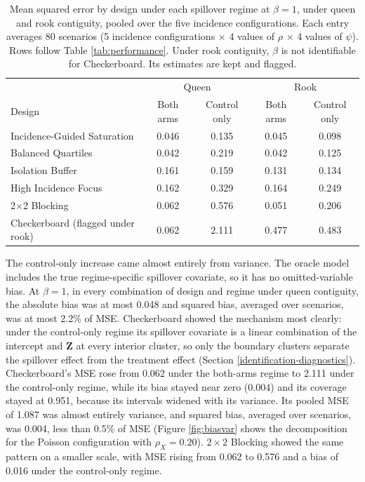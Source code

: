 \documentclass[11pt]{article}
\begin{document}
\iffullsi
\begin{table}[!htb]

\small
\centering
\setlength{\tabcolsep}{4pt}

\caption{Mean squared error by design under each spillover regime at $\beta = 1$, under queen and rook contiguity, pooled over the five incidence configurations. Each entry averages 80 scenarios (5 incidence configurations $\times$ 4 values of $\rho$ $\times$ 4 values of $\psi$). Rows follow Table \ref{tab:performance}. Under rook contiguity, $\beta$ is not identifiable for Checkerboard. Its estimates are kept and flagged.}
\label{tab:regime}

\begin{tabular}{lcccc}

\toprule
& \multicolumn{2}{c}{Queen} & \multicolumn{2}{c}{Rook} \\
Design & Both arms & Control only & Both arms & Control only \\

\midrule
Incidence-Guided Saturation & 0.046 & 0.135 & 0.045 & 0.098 \\
Balanced Quartiles & 0.042 & 0.219 & 0.042 & 0.125 \\
Isolation Buffer & 0.161 & 0.159 & 0.131 & 0.134 \\
High Incidence Focus & 0.162 & 0.329 & 0.164 & 0.249 \\
2$\times$2 Blocking & 0.062 & 0.576 & 0.051 & 0.206 \\
Checkerboard (flagged under rook) & 0.062 & 2.111 & 0.477 & 0.483 \\

\bottomrule

\end{tabular}

\end{table}
\fi

The control-only increase came almost entirely from variance. The
oracle model includes the true regime-specific spillover covariate, so
it has no omitted-variable bias. At \(\beta = 1\), in every combination
of design and regime under queen contiguity, the absolute bias was at
most 0.048 and squared bias, averaged over scenarios, was at most 2.2\%
of MSE. Checkerboard showed the mechanism most clearly: under the
control-only regime its spillover covariate is a linear combination of
the intercept and \(\mathbf{Z}\) at every interior cluster, so only the boundary
clusters separate the spillover effect from the treatment effect
(Section \ref{identification-diagnostics}). Checkerboard's MSE rose from 0.062 under the both-arms regime
to 2.111 under the control-only regime, while its bias stayed near zero
(0.004) and its coverage stayed at 0.951, because its intervals widened with its
variance. Its pooled MSE of 1.087 was almost entirely variance, and squared
bias, averaged over scenarios, was 0.004, less than 0.5\% of MSE
(Figure \ref{fig:biasvar} shows the decomposition for the Poisson
configuration with \(\rho_X = 0.20\)). \(2\times2\) Blocking showed the
same pattern on a smaller scale, with MSE rising from 0.062 to 0.576 and
a bias of 0.016 under the control-only regime.
\end{document}
